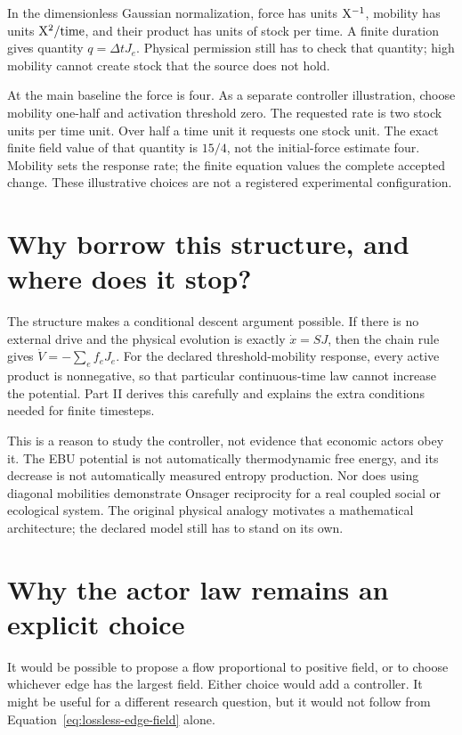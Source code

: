 In the dimensionless Gaussian normalization, force has units \(\mathrm{X}^{-1}\),
mobility has units \(\mathrm{X}^2/\mathrm{time}\), and their product has units of
stock per time. A finite duration gives quantity \(q=\Delta t J_e\).
Physical permission still has to check that quantity; high mobility cannot
create stock that the source does not hold.

At the main baseline the force is four. As a separate controller illustration,
choose mobility one-half and activation threshold zero. The requested rate
is two stock units per time unit. Over half a time unit it requests one
stock unit. The exact finite field value of that quantity is \(15/4\), not
the initial-force estimate four. Mobility sets the response rate; the finite
equation values the complete accepted change. These illustrative choices are
not a registered experimental configuration.

\section{Why borrow this structure, and where does it stop?}
The structure makes a conditional descent argument possible. If there is no
external drive and the physical evolution is exactly \(\dot x=SJ\), then
the chain rule gives \(\dot V=-\sum_e f_eJ_e\). For the declared
threshold-mobility response, every active product is nonnegative, so that
particular continuous-time law cannot increase the potential. Part II derives
this carefully and explains the extra conditions needed for finite timesteps.

This is a reason to study the controller, not evidence that economic actors
obey it. The EBU potential is not automatically thermodynamic free energy,
and its decrease is not automatically measured entropy production. Nor does
using diagonal mobilities demonstrate Onsager reciprocity for a real coupled
social or ecological system. The original physical analogy motivates a
mathematical architecture; the declared model still has to stand on its own.

\section{Why the actor law remains an explicit choice}
It would be possible to propose a flow proportional to positive field, or to choose whichever edge has the largest field. Either choice would add a controller. It might be useful for a different research question, but it would not follow from Equation~\ref{eq:lossless-edge-field} alone.

